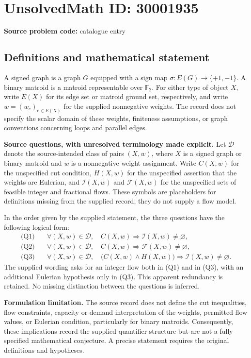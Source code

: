 \documentclass[11pt]{article}
\newcommand{\F}{\mathbb{F}}
\begin{document}
\section*{UnsolvedMath ID: 30001935}
\textbf{Source problem code:} catalogue entry
\subsection{Definitions and mathematical statement}
A signed graph is a graph \(G\) equipped with a sign map \(\sigma:E(G)\to\{+1,-1\}\). A binary matroid is a matroid representable over \(\F_2\). For either type of object \(X\), write \(E(X)\) for its edge set or matroid ground set, respectively, and write \(w=(w_e)_{e\in E(X)}\) for the supplied nonnegative weights. The record does not specify the scalar domain of these weights, finiteness assumptions, or graph conventions concerning loops and parallel edges.

\textbf{Source questions, with unresolved terminology made explicit.} Let \(\mathcal D\) denote the source-intended class of pairs \((X,w)\), where \(X\) is a signed graph or binary matroid and \(w\) is a nonnegative weight assignment. Write \(C(X,w)\) for the unspecified cut condition, \(H(X,w)\) for the unspecified assertion that the weights are Eulerian, and \(\mathcal I(X,w)\) and \(\mathcal F(X,w)\) for the unspecified sets of feasible integer and fractional flows. These symbols are placeholders for definitions missing from the supplied record; they do not supply a flow model.

In the order given by the supplied statement, the three questions have the following logical form:
\[
\begin{aligned}
\text{(Q1)}\quad &\forall (X,w)\in\mathcal D,\quad C(X,w)\Longrightarrow\mathcal I(X,w)\ne\varnothing,\\
\text{(Q2)}\quad &\forall (X,w)\in\mathcal D,\quad C(X,w)\Longrightarrow\mathcal F(X,w)\ne\varnothing,\\
\text{(Q3)}\quad &\forall (X,w)\in\mathcal D,\quad
\bigl(C(X,w)\land H(X,w)\bigr)\Longrightarrow\mathcal I(X,w)\ne\varnothing.
\end{aligned}
\]
The supplied wording asks for an integer flow both in (Q1) and in (Q3), with an additional Eulerian hypothesis only in (Q3). This apparent redundancy is retained. No missing distinction between the questions is inferred.

\textbf{Formulation limitation.} The source record does not define the cut inequalities, flow constraints, capacity or demand interpretation of the weights, permitted flow values, or Eulerian condition, particularly for binary matroids. Consequently, these implications record the supplied quantifier structure but are not a fully specified mathematical conjecture. A precise statement requires the original definitions and hypotheses.
\end{document}
